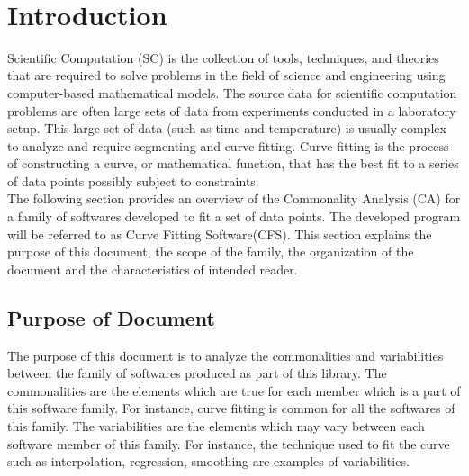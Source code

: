 \documentclass[12pt]{article}
\newcommand{\famname}{CFS} %
\begin{document}
\newpage

\tableofcontents

~\newpage


\section{Introduction}

Scientific Computation (SC) is the collection of tools, techniques, and theories that are required to solve problems in the field of science and engineering using computer-based mathematical models. The source data for scientific computation problems are often large sets of data from experiments conducted in a laboratory setup. This large set of data (such as time and temperature) is usually complex to analyze and require segmenting and curve-fitting. Curve fitting is the process of constructing a curve, or mathematical function, that has the best fit to a series of data points possibly subject to constraints.\\

The following section provides an overview of the Commonality Analysis (CA) for a family of softwares developed to fit a set of data points. The developed program will be referred to as Curve Fitting Software(\famname{}). This section explains the purpose of this document, the scope of the family, the organization of the document and the characteristics of intended reader.
 


\subsection{Purpose of Document}
The purpose of this document is to analyze the commonalities and variabilities between the family of softwares produced as part of this library. The commonalities are the elements which are true for each member which is a part of this software family. For instance, curve fitting is common for all the softwares of this family. The variabilities are the elements which may vary between each software member of this family. For instance, the technique used to fit the curve such as interpolation, regression, smoothing are examples of variabilities.
\end{document}
